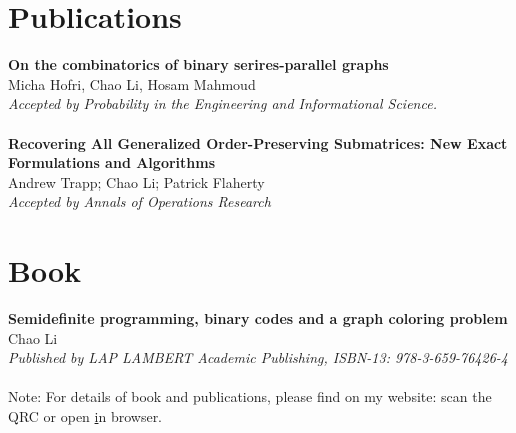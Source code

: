 \documentclass[]{friggeri-cv}
\begin{document}
\section{Publications}
\textbf{On the combinatorics of binary serires-parallel graphs}\\
Micha Hofri, Chao Li, Hosam Mahmoud\\
\emph{Accepted by Probability in the Engineering and Informational Science.}\\
\vspace{-3mm}\\
\textbf{Recovering All Generalized Order-Preserving Submatrices: New Exact
Formulations and Algorithms}\\
Andrew Trapp; Chao Li; Patrick Flaherty\\
\emph{Accepted by Annals of Operations Research}
\section{Book}
\textbf{Semidefinite programming, binary codes and a graph coloring problem}\\
Chao Li\\
\emph{Published by LAP LAMBERT Academic Publishing, ISBN-13: 978-3-659-76426-4}
~\\
Note: For details of book and publications, please find on my website: scan the QRC or open \href{http://chaopli.github.io} in browser.
\end{document}
